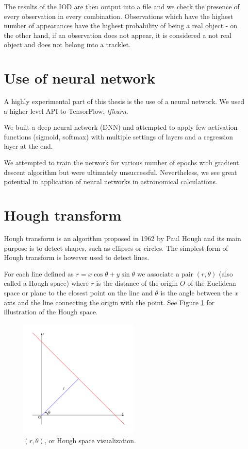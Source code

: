 	 The results of the IOD are then output into a file and we check the presence of every observation in every combination. Observations which have the highest number of appearances have the highest probability of being a real object - on the other hand, if an observation does not appear, it is considered a not real object and does not belong into a tracklet.

\section{Use of neural network}\label{sec:neural}
	
	A highly experimental part of this thesis is the use of a neural network. We used a higher-level API to TensorFlow, \emph{tflearn}.

	We built a deep neural network (DNN) and attempted to apply few activation functions (sigmoid, softmax) with multiple settings of layers and a regression layer at the end.
	
	We attempted to train the network for various number of epochs with gradient descent algorithm but were ultimately unsuccessful. Nevertheless, we see great potential in application of neural networks in astronomical calculations.

\section{Hough transform}\label{sec:hough}

	Hough transform is an algorithm proposed in 1962 by Paul Hough and its main purpose is to detect shapes, such as ellipses or circles. The simplest form of Hough transform is however used to detect lines.
	
	For each line defined as $r=x\cos\theta+y\sin\theta$ we associate a pair $(r,\theta)$ (also called a Hough space) where $r$ is the distance of the origin $O$ of the Euclidean space or plane to the closest point on the line and $\theta$ is the angle between the $x$ axis and the line connecting the origin with the point. See Figure \ref{fig:rtheta} for illustration of the Hough space.
	
	\begin{figure}[H]
	\centering
	  \includegraphics[width=6cm]{images/rtheta}
		  \caption{$(r,\theta)$, or Hough space visualization.}
	  \label{fig:rtheta}
	\end{figure}
	
